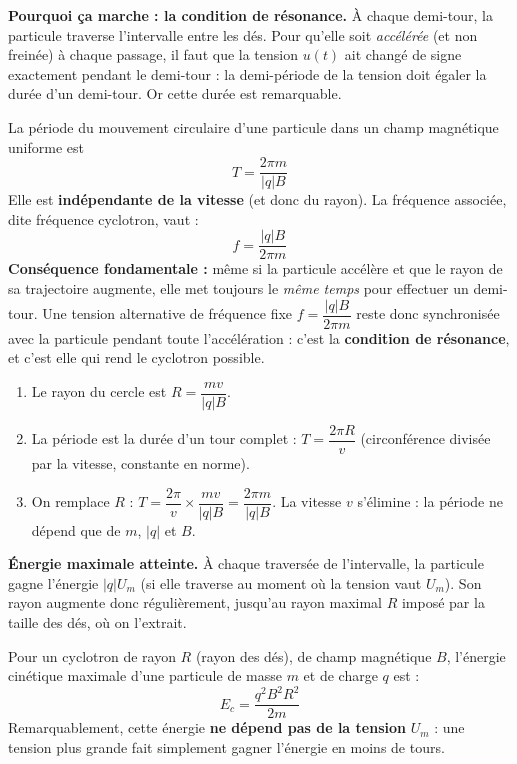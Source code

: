 \documentclass[11pt]{article}
\newcommand{\cle}[1]{{\popxbold\color{popdark}#1}}
\begin{document}
\textbf{Pourquoi ça marche : la condition de résonance.} À chaque demi-tour, la particule traverse l'intervalle entre les dés. Pour qu'elle soit \emph{accélérée} (et non freinée) à chaque passage, il faut que la tension $u(t)$ ait changé de signe exactement pendant le demi-tour : la demi-période de la tension doit égaler la durée d'un demi-tour. Or cette durée est remarquable.

\begin{propriete}
La période du mouvement circulaire d'une particule dans un champ magnétique uniforme est
\[ T = \frac{2\pi m}{|q|B} \]
Elle est \textbf{indépendante de la vitesse} (et donc du rayon). La fréquence associée, dite \cle{fréquence cyclotron}, vaut :
\[ f = \frac{|q|B}{2\pi m} \]
\textbf{Conséquence fondamentale :} même si la particule accélère et que le rayon de sa trajectoire augmente, elle met toujours le \emph{même temps} pour effectuer un demi-tour. Une tension alternative de fréquence fixe $f = \dfrac{|q|B}{2\pi m}$ reste donc synchronisée avec la particule pendant toute l'accélération : c'est la \textbf{condition de résonance}, et c'est elle qui rend le cyclotron possible.
\end{propriete}

\begin{experience}
\begin{enumerate}
\item Le rayon du cercle est $R = \dfrac{mv}{|q|B}$.
\item La période est la durée d'un tour complet : $T = \dfrac{2\pi R}{v}$ (circonférence divisée par la vitesse, constante en norme).
\item On remplace $R$ : $T = \dfrac{2\pi}{v}\times\dfrac{mv}{|q|B} = \dfrac{2\pi m}{|q|B}$. La vitesse $v$ s'élimine : la période ne dépend que de $m$, $|q|$ et $B$.
\end{enumerate}
\end{experience}

\textbf{Énergie maximale atteinte.} À chaque traversée de l'intervalle, la particule gagne l'énergie $|q|U_m$ (si elle traverse au moment où la tension vaut $U_m$). Son rayon augmente donc régulièrement, jusqu'au rayon maximal $R$ imposé par la taille des dés, où on l'extrait.

\begin{propriete}
Pour un cyclotron de rayon $R$ (rayon des dés), de champ magnétique $B$, l'énergie cinétique maximale d'une particule de masse $m$ et de charge $q$ est :
\[ E_c = \frac{q^2B^2R^2}{2m} \]
Remarquablement, cette énergie \textbf{ne dépend pas de la tension} $U_m$ : une tension plus grande fait simplement gagner l'énergie en moins de tours.
\end{propriete}
\end{document}
